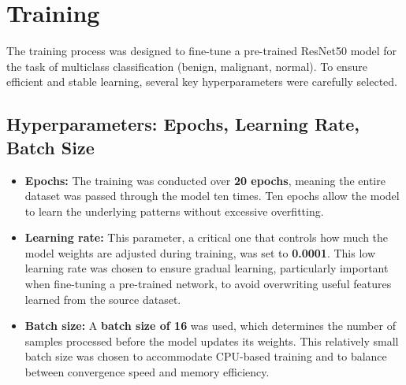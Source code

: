 
\section{Training}

The training process was designed to fine-tune a pre-trained ResNet50 model for the task of 
multiclass classification (benign, malignant, normal). To ensure efficient and stable learning, 
several key hyperparameters were carefully selected.


\subsection{Hyperparameters: Epochs, Learning Rate, Batch Size}

\begin{itemize}
    \item \textbf{Epochs:} The training was conducted over \textbf{20 epochs}, meaning the entire 
    dataset was passed through the model ten times. Ten epochs allow the model to learn the 
    underlying patterns without excessive overfitting.

    \item \textbf{Learning rate:} This parameter, a critical one that controls how much the model 
    weights are adjusted during training, was set to \textbf{0.0001}. This low learning rate was 
    chosen to ensure gradual learning, particularly important when fine-tuning a pre-trained 
    network, to avoid overwriting useful features learned from the source dataset.

    \item \textbf{Batch size:} A \textbf{batch size of 16} was used, which determines the number of 
    samples processed before the model updates its weights. This relatively small batch size was 
    chosen to accommodate CPU-based training and to balance between convergence speed and memory 
    efficiency.
\end{itemize}

